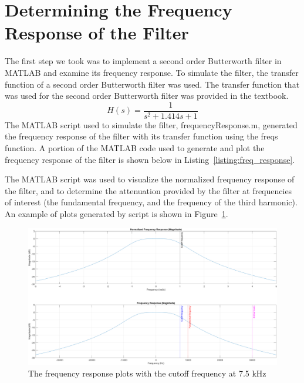 \documentclass[12pt]{article}
\begin{document}
\section*{Determining the Frequency Response of the Filter}
The first step we took was to implement a second order Butterworth filter in MATLAB and examine its frequency response. To simulate the filter, the transfer function of a second order Butterworth filter was used. The transfer function that was used for the second order Butterworth filter was provided in the textbook.
\begin{equation*}
    H(s) = \frac{1}{s^2 + 1.414s + 1}
\end{equation*}
The MATLAB script used to simulate the filter, frequencyResponse.m, generated the frequency response of the filter with its transfer function using the freqs function. A portion of the MATLAB code used to generate and plot the frequency response of the filter is shown below in Listing~\ref{listing:freq_response}.

The MATLAB script was used to visualize the normalized frequency response of the filter, and to determine the attenuation provided by the filter at frequencies of interest (the fundamental frequency, and the frequency of the third harmonic). An example of plots generated by script is shown in Figure~\ref{fig:example_freq_response}.
\begin{figure}[h!]
    \includegraphics[width=\textwidth]{example_frequency_response.png}
    \caption{\label{fig:example_freq_response} The frequency response plots with the cutoff frequency at 7.5 kHz}
\end{figure}
\end{document}
